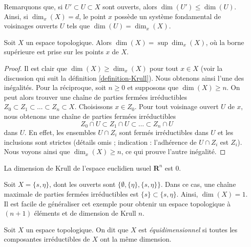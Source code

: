 \noindent
Remarquons que, si $U' \subset U \subset X$ sont ouverts, alors
$\dim(U') \leq \dim(U)$. Ainsi, si $\dim_x(X) = d$, le point $x$ possède un
système fondamental de voisinages ouverts $U$ tels que
$\dim(U) = \dim_x(X)$.

\begin{lemma}
\label{lemma-dimension-supremum-local-dimensions}
Soit $X$ un espace topologique. Alors $\dim(X) = \sup \dim_x(X)$, où la borne
supérieure est prise sur les points $x$ de $X$.
\end{lemma}

\begin{proof}
Il est clair que $\dim(X) \geq \dim_x(X)$ pour tout $x \in X$ (voir la
discussion qui suit la définition \ref{definition-Krull}). Nous obtenons ainsi
l'une des inégalités. Pour la réciproque, soit $n \geq 0$ et supposons que
$\dim(X) \geq n$. On peut alors trouver une chaîne de parties fermées
irréductibles $Z_0 \subset Z_1 \subset \ldots \subset Z_n \subset X$.
Choisissons $x \in Z_0$. Pour tout voisinage ouvert $U$ de $x$, nous obtenons
une chaîne de parties fermées irréductibles
$$
Z_0 \cap U \subset Z_1 \cap U \subset \ldots \subset Z_n \cap U
$$
dans $U$. En effet, les ensembles $U \cap Z_i$ sont fermés irréductibles dans
$U$ et
les inclusions sont strictes (détails omis ; indication : l'adhérence de
$U \cap Z_i$ est $Z_i$).
Nous voyons ainsi que $\dim_x(X) \geq n$, ce qui prouve l'autre inégalité.
\end{proof}

\begin{example}
\label{example-Krull-Rn}
La dimension de Krull de l'espace euclidien usuel $\mathbf{R}^n$ est $0$.
\end{example}

\begin{example}
\label{example-krull-2set}
Soit $X = \{s, \eta\}$, dont les ouverts sont
$\{\emptyset, \{\eta\}, \{s, \eta\}\}$.
Dans ce cas, une chaîne maximale de parties fermées irréductibles est
$\{s\} \subset \{s, \eta\}$. Ainsi, $\dim(X) = 1$. Il est facile de
généraliser cet exemple pour obtenir un espace topologique à $(n + 1)$
éléments et de dimension de Krull $n$.
\end{example}

\begin{definition}
\label{definition-equidimensional}
Soit $X$ un espace topologique.
On dit que $X$ est {\it équidimensionnel} si toutes les composantes
irréductibles de $X$ ont la même dimension.
\end{definition}





